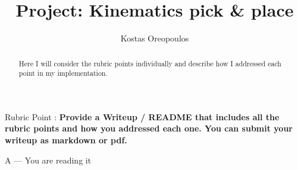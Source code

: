 \documentclass[a4paper,11pt]{article}
\author{Kostas Oreopoulos}
\title{Project: Kinematics pick \& place}
\date{}
\newcounter{question}
\newcommand\Que[1]{%
	   \leavevmode\par
	   \stepcounter{question}
	   \noindent
	   Rubric Point \thequestion :  {\bf #1}\par}
\newcommand\Ans[2][]{%
    \leavevmode\par\noindent
   {\leftskip37pt
    A --- \textbf{#1}#2\par}}
\begin{document}
\lstset{
    frame       = single,
    numbers     = left,
    showspaces  = false,
    showstringspaces    = false,
    captionpos  = t,
    caption     = \lstname,
    style = Python,
    escapechar=@,
}
\maketitle
\begin{abstract}
	Here I will consider the rubric points individually and describe how I addressed each point in my implementation.
\end{abstract}

\Que{Provide a Writeup / README that includes all the rubric points and how you addressed each one. You can submit your writeup as markdown or pdf.}
\Ans{You are reading it}
\end{document}
